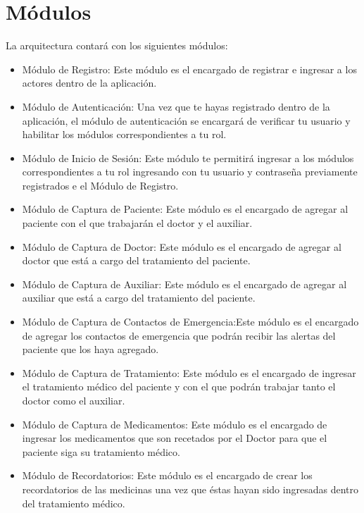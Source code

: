 \section{Módulos}
La arquitectura contará con los siguientes módulos:
\begin{itemize}
	\item Módulo de Registro: Este módulo es el encargado de registrar e ingresar a los actores dentro de la aplicación. 
	
	
	\item Módulo de Autenticación: Una vez que te hayas registrado dentro de la aplicación, el módulo de autenticación se encargará de verificar tu usuario y habilitar los módulos correspondientes a tu rol.
	
	\item Módulo de Inicio de Sesión: Este módulo te permitirá ingresar a los módulos correspondientes a tu rol ingresando con tu usuario y contraseña previamente registrados e el Módulo de Registro.
	
	 
	\item Módulo de Captura de Paciente: Este módulo es el encargado de agregar al paciente con el que trabajarán el doctor y el auxiliar.
	
	\item Módulo de Captura de Doctor: Este módulo es el encargado de agregar al doctor que está a cargo del tratamiento del paciente.
	
	\item Módulo de Captura de Auxiliar: Este módulo es el encargado de agregar al auxiliar que está a cargo del tratamiento del paciente.
	
	\item Módulo de Captura de Contactos de Emergencia:Este módulo es el encargado de agregar los contactos de emergencia que podrán recibir las alertas del paciente que los haya agregado.
	
	\item Módulo de Captura de Tratamiento: Este módulo es el encargado de ingresar el tratamiento médico del paciente y con el que podrán trabajar tanto el doctor como el auxiliar. 

	\item Módulo de Captura de Medicamentos: Este módulo es el encargado de ingresar los medicamentos que son recetados por el Doctor para que el paciente siga su tratamiento médico.
	
	\item Módulo de Recordatorios: Este módulo es el encargado de crear los recordatorios de las medicinas una vez que éstas hayan sido ingresadas dentro del tratamiento médico.
	

\end{itemize}
